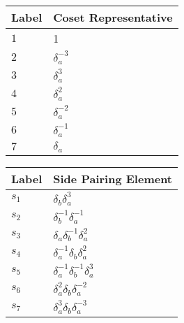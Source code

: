 \documentclass{article}
\begin{document}
\begin{center}
\begin{tabular}{ll}
\toprule
Label & Coset Representative\\
\midrule
$1$ & 1 \\
$2$ & $\delta_a^{-3}$ \\
$3$ & $\delta_a^{3}$ \\
$4$ & $\delta_a^{2}$ \\
$5$ & $\delta_a^{-2}$ \\
$6$ & $\delta_a^{-1}$ \\
$7$ & $\delta_a^{}$ \\
\bottomrule
\end{tabular}
\hfill
\begin{tabular}{ll}
\toprule
Label & Side Pairing Element\\
\midrule
$s_{1}$ & $\delta_b^{}\delta_a^{3}$ \\
$s_{2}$ & $\delta_b^{-1}\delta_a^{-1}$ \\
$s_{3}$ & $\delta_a^{}\delta_b^{-1}\delta_a^{2}$ \\
$s_{4}$ & $\delta_a^{-1}\delta_b^{}\delta_a^{2}$ \\
$s_{5}$ & $\delta_a^{-1}\delta_b^{-1}\delta_a^{3}$ \\
$s_{6}$ & $\delta_a^{2}\delta_b^{}\delta_a^{-2}$ \\
$s_{7}$ & $\delta_a^{3}\delta_b^{}\delta_a^{-3}$ \\
\bottomrule
\end{tabular}
\end{center}

\thispagestyle{empty}
\end{document}
